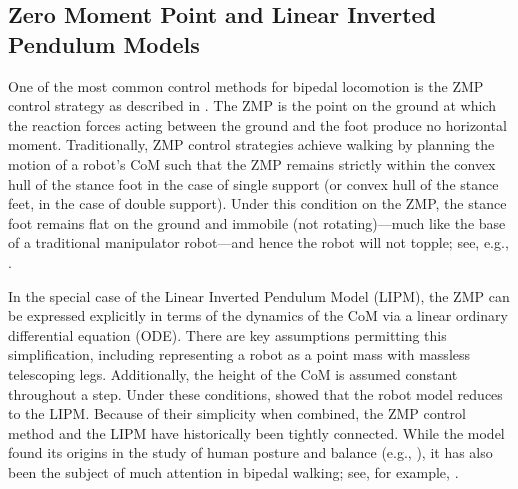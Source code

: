 \subsection{Zero Moment Point and Linear Inverted Pendulum Models}

One of the most common control methods for bipedal locomotion is the ZMP control
strategy as described in \cite{Vukobratovic2004,Vukobratovic1990}.
%
The ZMP is the point on the ground at which the reaction forces acting between
the ground and the foot produce no horizontal moment.
%
Traditionally, ZMP control strategies achieve walking by planning the motion of a robot's CoM such that the ZMP remains strictly within the convex hull of the stance foot in the case of single support (or convex hull of the stance feet, in the case of double support).
%
Under this condition on the ZMP, the stance foot remains flat on the ground and immobile (not rotating)---much like the base of a traditional manipulator robot---and hence the robot will not topple; see, e.g., \cite{Yamaguchi1999}.

In the special case of the Linear Inverted Pendulum Model (LIPM),
%
%
the ZMP can be expressed explicitly in terms of the dynamics of the CoM via a linear ordinary differential equation (ODE).
%
There are key assumptions permitting this simplification, including representing a robot as a point mass with massless telescoping legs.
%
Additionally, the height of the CoM is assumed constant throughout a step.
%
Under these conditions, \cite{Kajita1991} showed that the robot model reduces to the LIPM.
%
%
Because of their simplicity when combined, the ZMP control method and the LIPM have historically been tightly connected.
%
%
%
%
While the model found its origins in the study of human posture and balance
(e.g., \cite{Geursen1976,Winter1995,Patton1999}), it has also been the subject
of much attention in bipedal walking; see, for example,
\cite{Miura1984,Kajita2001,Kajita2010}.
%



